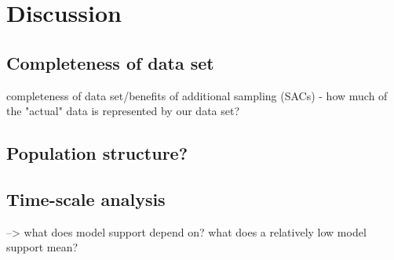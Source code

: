 \section{Discussion}

\subsection{Completeness of data set}

completeness of data set/benefits of additional sampling (SACs)
- how much of the "actual" data is represented by our data set?




\subsection{Population structure?}


\subsection{Time-scale analysis}

--> what does model support depend on? what does a relatively low model support mean?


